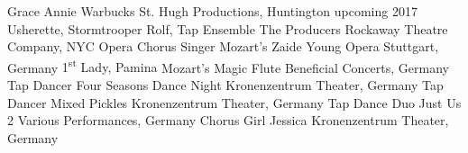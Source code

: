 \begin{cventries}
  \cventrytabb %
    {Grace}%
    {Annie Warbucks}%
    {St. Hugh Productions, Huntington}%
    {upcoming 2017} %
  \cventrytab 
    {Usherette, Stormtrooper Rolf, Tap Ensemble}%
    {The Producers}%
    {Rockaway Theatre Company, NYC}%
    {} %
  \cventrytab
    {Opera Chorus Singer}%
    {Mozart's Zaide}%
    {Young Opera Stuttgart, Germany}%
    {}
  \cventrytab
    {1\textsuperscript{st} Lady, Pamina}
    {Mozart's Magic Flute}
    {Beneficial Concerts, Germany}
    {}
  \cventrytab
    {Tap Dancer}
    {Four Seasons Dance Night}
    {Kronenzentrum Theater, Germany}
    {} 
  \cventrytab
    {Tap Dancer}
    {Mixed Pickles}
    {Kronenzentrum Theater, Germany}
    {}
  \cventrytab
    {Tap Dance Duo}
    {Just Us 2}
    {Various Performances, Germany}
    {}
  \cventrytab
    {Chorus Girl}
    {Jessica}
    {Kronenzentrum Theater, Germany}
    {}
\end{cventries}
